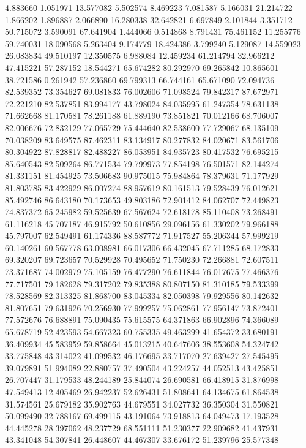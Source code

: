 4.883660
1.051971
13.577082
5.502574
8.469223
7.081587
5.166031
21.214722
1.866202
1.896887
2.066890
16.280338
32.642821
6.697849
2.101844
3.351712
50.715072
3.590091
67.641904
1.444066
0.514868
8.791431
75.461152
11.255776
59.740031
18.090568
5.263404
9.174779
18.424386
3.799240
5.129087
14.559023
26.083834
49.510197
12.350575
6.988084
12.459234
61.214794
32.966212
47.415221
57.287152
18.544271
65.674282
80.292970
69.265842
10.865601
38.721586
0.261942
57.236860
69.799313
66.744161
65.671090
72.094736
82.539352
73.354627
69.081833
76.002606
71.098524
79.842317
87.672971
72.221210
82.537851
83.994177
43.798024
84.035995
61.247354
78.631138
71.662668
81.170581
78.261188
61.889190
73.851821
70.012166
68.706007
82.006676
72.832129
77.065729
75.444640
82.538600
77.729067
68.135109
70.038209
83.649575
87.462311
83.134917
80.277832
84.020671
83.561706
80.304922
87.828817
82.488227
86.053951
84.935723
80.417532
76.695215
85.640543
82.509264
86.771534
79.799973
77.854198
76.501571
82.144274
81.331151
81.454925
73.506683
90.975015
75.984864
78.379631
71.177929
81.803785
83.422929
86.007274
88.957619
80.161513
79.528439
76.012621
85.492746
86.643180
70.173653
49.803186
72.901412
84.062707
72.449823
74.837372
65.245982
59.525639
67.567624
72.618178
85.110408
73.268491
61.116218
45.707187
46.915792
50.610856
29.096156
61.330202
79.966188
45.797007
62.549491
61.174336
88.587772
71.917527
55.206344
57.999219
60.140261
60.567778
63.008981
66.017306
66.432045
67.711285
68.172833
69.320207
69.723657
70.529928
70.495652
71.750230
72.266881
72.607511
73.371687
74.002979
75.105159
76.477290
76.611844
76.017675
77.466376
77.717501
79.182628
79.317202
79.835388
80.807150
81.310185
79.533399
78.528569
82.313325
81.868700
83.045334
82.050398
79.929556
80.142632
81.807651
79.631926
70.256930
77.999257
75.062861
77.956147
73.872401
77.572676
76.688891
75.090435
75.615575
64.371863
66.902896
74.366089
65.678719
52.423593
54.667323
60.755335
49.463299
41.654372
33.680191
36.409934
45.583959
59.858664
45.013215
40.647606
38.553608
54.324742
33.775848
43.314022
41.099532
46.176695
33.717070
27.639427
27.545495
39.079891
51.994089
22.880757
37.490504
43.224257
44.052513
43.425851
26.707447
31.179533
48.244189
25.844074
26.690581
66.418915
31.876998
47.549413
12.405469
26.942237
52.626431
51.808641
64.134675
61.864538
31.574561
25.679182
35.902763
44.679551
34.027732
36.350304
31.550821
50.099490
32.788167
69.499115
43.191064
73.918813
64.049473
17.193528
44.445278
28.397062
48.237729
68.551111
51.230377
22.909682
41.437931
43.341048
54.307841
26.448607
44.467307
33.676172
51.239796
25.577348

